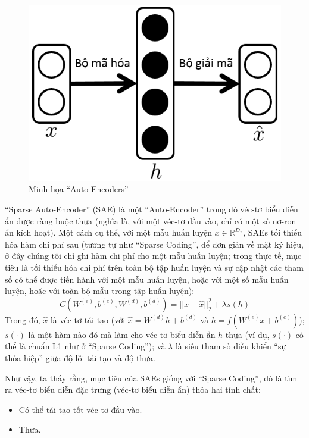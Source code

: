 \begin{figure}
	\centering
	\includegraphics[scale=0.8]{AE}
	\caption{Minh họa ``Auto-Encoders''}
	\label{fig_AE}
\end{figure}
``Sparse Auto-Encoder'' (SAE) là một ``Auto-Encoder'' trong đó véc-tơ biểu diễn ẩn được ràng buộc thưa (nghĩa là, với một véc-tơ đầu vào, chỉ có một số nơ-ron ẩn kích hoạt). Một cách cụ thể, với một mẫu huấn luyện $x \in \mathbb{R}^{D_x}$, SAEs tối thiểu hóa hàm chi phí sau (tương tự như ``Sparse Coding'', để đơn giản về mặt ký hiệu, ở đây chúng tôi chỉ ghi hàm chi phí cho một mẫu huấn luyện; trong thực tế, mục tiêu là tối thiểu hóa chi phí trên toàn bộ tập huấn luyện và sự cập nhật các tham số có thể được tiến hành với một mẫu huấn luyện, hoặc với một số mẫu huấn luyện, hoặc với toàn bộ mẫu trong tập huấn luyện):
\begin{equation}
	C(W^{(e)}, b^{(e)}, W^{(d)}, b^{(d)}) = ||x - \hat{x}||_2^2 + \lambda s(h)
	\label{eq_SAE}
\end{equation}
Trong đó, $\hat{x}$ là véc-tơ tái tạo (với $\hat{x} = W^{(d)}h + b^{(d)}$ và $h = f(W^{(e)}x + b^{(e)})$); $s(\cdot)$ là một hàm nào đó mà làm cho véc-tơ biểu diễn ẩn $h$ thưa (ví dụ, $s(\cdot)$ có thể là chuẩn L1 như ở ``Sparse Coding''); và $\lambda$ là siêu tham số điều khiển ``sự thỏa hiệp'' giữa độ lỗi tái tạo và độ thưa.

Như vậy, ta thấy rằng, mục tiêu của SAEs giống với ``Sparse Coding'', đó là tìm ra véc-tơ biểu diễn đặc trưng (véc-tơ biểu diễn ẩn) thỏa hai tính chất:
\begin{itemize}
	\item Có thể tái tạo tốt véc-tơ đầu vào.
	\item Thưa.
\end{itemize}

